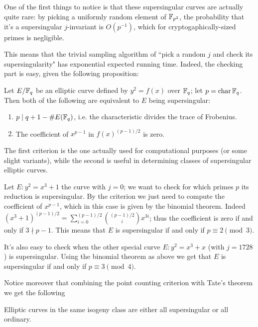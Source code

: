 One of the first things to notice is that these supersingular curves are actually quite rare: by picking a uniformly random element of $\mathbb{F}_{p^2}$, the probability that it's a supersingular $j$-invariant is $O(p^{-1})$, which for cryptogaphically-sized primes is negligible.

This means that the trivial sampling algorithm of ``pick a random $j$ and check its supersingularity" has exponential expected running time. Indeed, the checking part is easy, given the following proposition:
\begin{proposition}
    Let $E/\mathbb{F}_q$ be an elliptic curve defined by $y^2=f(x)$ over $\mathbb{F}_q$; let $p=\operatorname{char}\mathbb{F}_q$. Then both of the following are equivalent to $E$ being supersingular:
    \begin{enumerate}
        \item $p\mid q+1-\# E(\mathbb{F}_q)$, i.e. the characteristic divides the trace of Frobenius.
        \item The coefficient of $x^{p-1}$ in $f(x)^{(p-1)/2}$ is zero.
    \end{enumerate}
\end{proposition}

The first criterion is the one actually used for computational purposes (or some slight variants), while the second is useful in determining classes of supersingular elliptic curves.

\begin{example}
    Let $E:y^2=x^3+1$ the curve with $j=0$; we want to check for which primes $p$ its reduction is supersingular. By the criterion we just need to compute the coefficient of $x^{p-1}$, which in this case is given by the binomial theorem. Indeed $(x^3+1)^{(p-1)/2}=\sum_{i=0}^{(p-1)/2}\binom{(p-1)/2}{i}x^{3i}$; thus the coefficient is zero if and only if $3\nmid p-1$. This means that $E$ is supersingular if and only if $p\equiv2\pmod 3$.
\end{example}

\begin{example}
    It's also easy to check when the other special curve $E: y^2=x^3+x$ (with $j=1728$) is supersingular. Using the binomial theorem as above we get that $E$ is supersingular if and only if $p\equiv3\pmod4$.
\end{example}

Notice moreover that combining the point counting criterion with Tate's theorem we get the following
\begin{remark}
    Elliptic curves in the same isogeny class are either all supersingular or all ordinary.
\end{remark}

